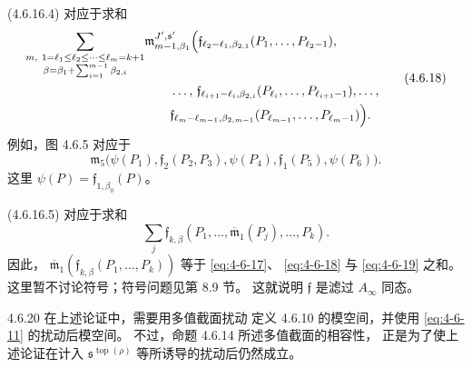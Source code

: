 (4.6.16.4) 对应于求和
\begin{equation}
 \begin{aligned}
 \sum_{\substack{m,\ 1=\ell_1\le\ell_2\le
                   \cdots\le\ell_m=k+1\\
                  \beta=\beta_1+
                   \sum_{i=1}^{m-1}\beta_{2,i}}}
 &\mathfrak m^{J',\mathfrak s'}_{m-1,\beta_1}
 \Bigl(
 \mathfrak f_{\ell_2-\ell_1,\beta_{2,1}}
 (P_1,\ldots,P_{\ell_2-1}),\\
 &\qquad\ldots,\,
 \mathfrak f_{\ell_{i+1}-\ell_i,\beta_{2,i}}
 (P_{\ell_i},\ldots,P_{\ell_{i+1}-1}),
 \ldots,\\
 &\qquad
 \mathfrak f_{\ell_m-\ell_{m-1},\beta_{2,m-1}}
 (P_{\ell_{m-1}},\ldots,P_{\ell_m-1})
 \Bigr).
 \end{aligned}
\tag{4.6.18}\label{eq:4-6-18}
\end{equation}
例如，图 4.6.5 对应于
\[
 \mathfrak m_5\bigl(
 \psi(P_1),\mathfrak f_2(P_2,P_3),
 \psi(P_4),\mathfrak f_1(P_5),\psi(P_6)\bigr).
\]
这里 $\psi(P)=\mathfrak f_{1,\beta_0}(P)$。

(4.6.16.5) 对应于求和
\begin{equation}
 \sum_j\mathfrak f_{k,\beta}
 (P_1,\ldots,\overline{\mathfrak m}_1(P_j),
  \ldots,P_k).
\tag{4.6.19}\label{eq:4-6-19}
\end{equation}
因此，
$\overline{\mathfrak m}_1
(\mathfrak f_{k,\beta}(P_1,\ldots,P_k))$
等于 \eqref{eq:4-6-17}、
\eqref{eq:4-6-18} 与 \eqref{eq:4-6-19}
之和。这里暂不讨论符号；符号问题见第 8.9 节。
这就说明 $\mathfrak f$ 是滤过 $A_\infty$ 同态。

\begin{remark}{4.6.20}\label{rem:4-6-20}
在上述论证中，需要用多值截面扰动
定义 4.6.10 的模空间，并使用
\eqref{eq:4-6-11} 的扰动后模空间。
不过，命题 4.6.14 所述多值截面的相容性，
正是为了使上述论证在计入
$\mathfrak s^{\operatorname{top}(\rho)}$
等所诱导的扰动后仍然成立。
\end{remark}
